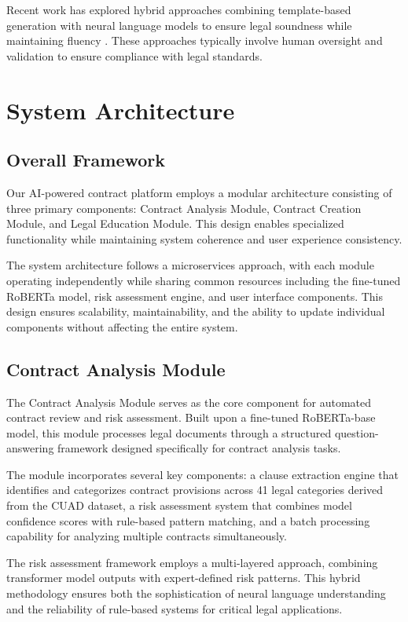 \documentclass[conference]{IEEEtran}
\begin{document}
Recent work has explored hybrid approaches combining template-based generation with neural language models to ensure legal soundness while maintaining fluency \cite{hybrid_legal2023}. These approaches typically involve human oversight and validation to ensure compliance with legal standards.

\section{System Architecture}

\subsection{Overall Framework}

Our AI-powered contract platform employs a modular architecture consisting of three primary components: Contract Analysis Module, Contract Creation Module, and Legal Education Module. This design enables specialized functionality while maintaining system coherence and user experience consistency.

The system architecture follows a microservices approach, with each module operating independently while sharing common resources including the fine-tuned RoBERTa model, risk assessment engine, and user interface components. This design ensures scalability, maintainability, and the ability to update individual components without affecting the entire system.

\subsection{Contract Analysis Module}

The Contract Analysis Module serves as the core component for automated contract review and risk assessment. Built upon a fine-tuned RoBERTa-base model, this module processes legal documents through a structured question-answering framework designed specifically for contract analysis tasks.

The module incorporates several key components: a clause extraction engine that identifies and categorizes contract provisions across 41 legal categories derived from the CUAD dataset, a risk assessment system that combines model confidence scores with rule-based pattern matching, and a batch processing capability for analyzing multiple contracts simultaneously.

The risk assessment framework employs a multi-layered approach, combining transformer model outputs with expert-defined risk patterns. This hybrid methodology ensures both the sophistication of neural language understanding and the reliability of rule-based systems for critical legal applications.
\end{document}
